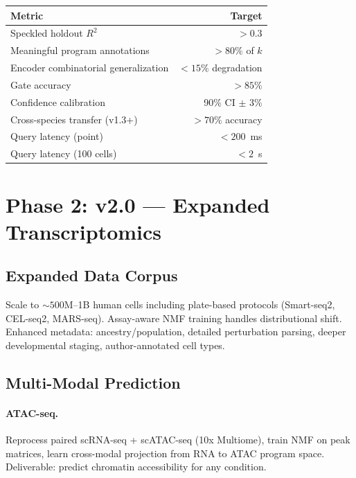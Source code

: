 \documentclass[10pt,twocolumn,letterpaper]{article}
\begin{document}
\begin{table}[h]
\centering\small
\begin{tabular}{@{}lr@{}}
\toprule
Metric & Target \\
\midrule
Speckled holdout $R^2$ & ${>}0.3$ \\
Meaningful program annotations & ${>}80\%$ of $k$ \\
Encoder combinatorial generalization & ${<}15\%$ degradation \\
Gate accuracy & ${>}85\%$ \\
Confidence calibration & 90\% CI $\pm$ 3\% \\
Cross-species transfer (v1.3+) & ${>}70\%$ accuracy \\
Query latency (point) & ${<}200$~ms \\
Query latency (100 cells) & ${<}2$~s \\
\bottomrule
\end{tabular}
\end{table}

\section{Phase 2: v2.0 --- Expanded Transcriptomics}

\subsection{Expanded Data Corpus}

Scale to ${\sim}500$M--1B human cells including plate-based protocols
(Smart-seq2, CEL-seq2, MARS-seq). Assay-aware NMF training handles
distributional shift. Enhanced metadata: ancestry/population, detailed
perturbation parsing, deeper developmental staging, author-annotated cell
types.

\subsection{Multi-Modal Prediction}

\paragraph{ATAC-seq.} Reprocess paired scRNA-seq + scATAC-seq (10x Multiome),
train NMF on peak matrices, learn cross-modal projection from RNA to ATAC
program space. Deliverable: predict chromatin accessibility for any condition.
\end{document}
